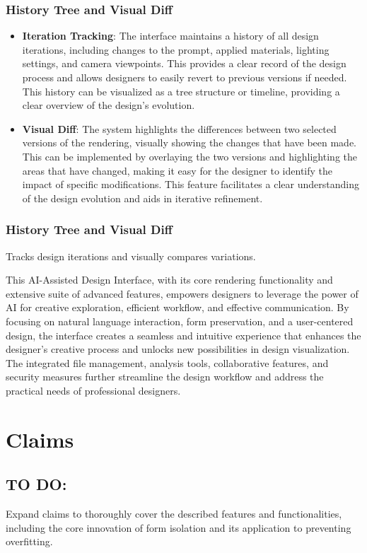 \subsubsection{History Tree and Visual Diff}
\begin{itemize}
\item \textbf{Iteration Tracking}: The interface maintains a history of all design iterations, including changes to the prompt, applied materials, lighting settings, and camera viewpoints. This provides a clear record of the design process and allows designers to easily revert to previous versions if needed. This history can be visualized as a tree structure or timeline, providing a clear overview of the design's evolution.
\item \textbf{Visual Diff}: The system highlights the differences between two selected versions of the rendering, visually showing the changes that have been made. This can be implemented by overlaying the two versions and highlighting the areas that have changed, making it easy for the designer to identify the impact of specific modifications. This feature facilitates a clear understanding of the design evolution and aids in iterative refinement.
\end{itemize}

\subsubsection{History Tree and Visual Diff} Tracks design iterations and visually compares variations.

This AI-Assisted Design Interface, with its core rendering functionality and extensive suite of advanced features, empowers designers to leverage the power of AI for creative exploration, efficient workflow, and effective communication. By focusing on natural language interaction, form preservation, and a user-centered design, the interface creates a seamless and intuitive experience that enhances the designer's creative process and unlocks new possibilities in design visualization. The integrated file management, analysis tools, collaborative features, and security measures further streamline the design workflow and address the practical needs of professional designers.

\section{Claims}

\subsection{TO DO:}
Expand claims to thoroughly cover the described features and functionalities, including the core innovation of form isolation and its application to preventing overfitting.


